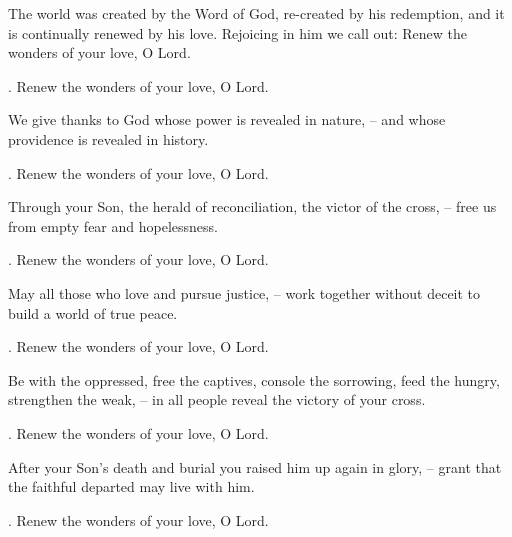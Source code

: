 \lettrine[loversize=0.15,lines=2]{T}{}he world was created by the Word of God, re-created by his redemption, and it is continually renewed by his love. Rejoicing in him we call out: Renew the wonders of your love, O Lord.
\par \Rbar. Renew the wonders of your love, O Lord.

We give thanks to God whose power is revealed in nature,
– and whose providence is revealed in history.
\par \Rbar. Renew the wonders of your love, O Lord.

Through your Son, the herald of reconciliation, the victor of the cross,
– free us from empty fear and hopelessness.
\par \Rbar. Renew the wonders of your love, O Lord.

May all those who love and pursue justice,
– work together without deceit to build a world of true peace.
\par \Rbar. Renew the wonders of your love, O Lord.

Be with the oppressed, free the captives, console the sorrowing, feed the hungry, strengthen the weak,
– in all people reveal the victory of your cross.
\par \Rbar. Renew the wonders of your love, O Lord.

After your Son’s death and burial you raised him up again in glory,
– grant that the faithful departed may live with him.
\par \Rbar. Renew the wonders of your love, O Lord.
